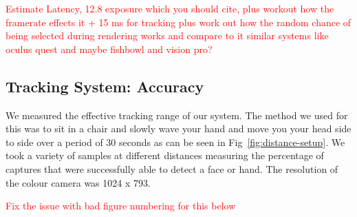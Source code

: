 \textcolor{red}{Estimate Latency, 12.8 exposure which you should cite, plus workout how the framerate effects it + 15 ms for tracking plus work out how the random chance of being selected during rendering works and compare to it similar systems like oculus quest and maybe fishbowl and vision pro?} 


\subsection{Tracking System: Accuracy}

We measured the effective tracking range of our system. The method we used for this was to sit in a chair and slowly wave your hand and move you your head side to side over a period of 30 seconds as can be seen in Fig~\ref{fig:distance-setup}. We took a variety of samples at different distances measuring the percentage of captures that were successfully able to detect a face or hand. The resolution of the colour camera was 1024 x 793. 

\textcolor{red}{Fix the issue with bad figure numbering for this below}
\begin{invisBox}  
	\hfill
\end{invisBox}

